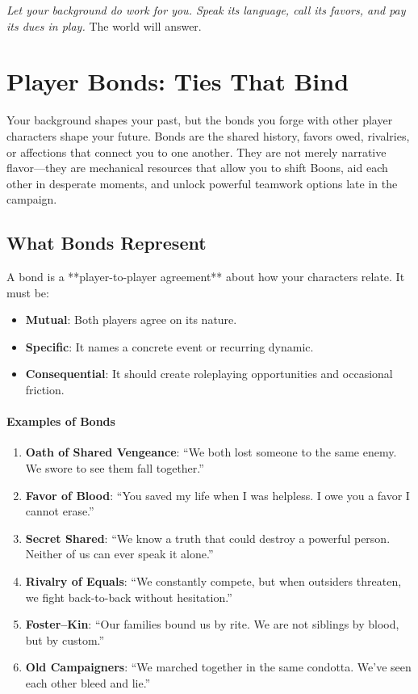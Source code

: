 \bigskip
\noindent\emph{Let your background do work for you. Speak its language, call its favors, and pay its dues in play.} The world will answer.

\section{Player Bonds: Ties That Bind}

Your background shapes your past, but the bonds you forge with other player characters shape your future. Bonds are the shared history, favors owed, rivalries, or affections that connect you to one another. They are not merely narrative flavor—they are mechanical resources that allow you to shift Boons, aid each other in desperate moments, and unlock powerful teamwork options late in the campaign.

\subsection{What Bonds Represent}
A bond is a **player-to-player agreement** about how your characters relate. It must be:
\begin{itemize}
\item \textbf{Mutual}: Both players agree on its nature.
\item \textbf{Specific}: It names a concrete event or recurring dynamic.
\item \textbf{Consequential}: It should create roleplaying opportunities and occasional friction.
\end{itemize}

\paragraph{Examples of Bonds}
\begin{enumerate}
\item \textbf{Oath of Shared Vengeance}: “We both lost someone to the same enemy. We swore to see them fall together.”
\item \textbf{Favor of Blood}: “You saved my life when I was helpless. I owe you a favor I cannot erase.”
\item \textbf{Secret Shared}: “We know a truth that could destroy a powerful person. Neither of us can ever speak it alone.”
\item \textbf{Rivalry of Equals}: “We constantly compete, but when outsiders threaten, we fight back-to-back without hesitation.”
\item \textbf{Foster–Kin}: “Our families bound us by rite. We are not siblings by blood, but by custom.”
\item \textbf{Old Campaigners}: “We marched together in the same condotta. We’ve seen each other bleed and lie.”
\end{enumerate}

